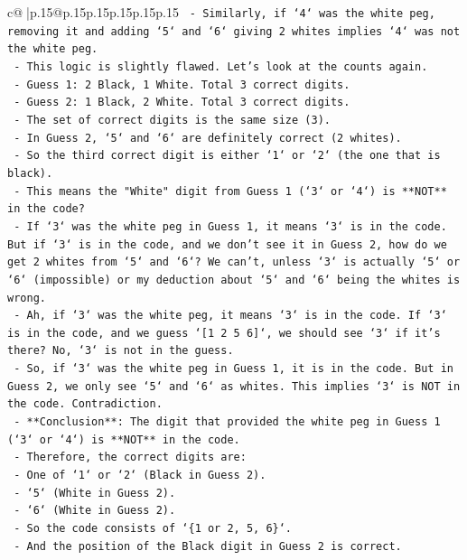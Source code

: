 \documentclass{article}
\begin{document}
{\begin{supertabular}{c@{$\;$}|p{.15\linewidth}@{}p{.15\linewidth}p{.15\linewidth}p{.15\linewidth}p{.15\linewidth}p{.15\linewidth}}
{{{\texttt{        {-} Similarly, if `4` was the white peg, removing it and adding `5` and `6` giving 2 whites implies `4` was not the white peg.} \\
\texttt{        {-} This logic is slightly flawed. Let's look at the counts again.} \\
\texttt{        {-} Guess 1: 2 Black, 1 White. Total 3 correct digits.} \\
\texttt{        {-} Guess 2: 1 Black, 2 White. Total 3 correct digits.} \\
\texttt{        {-} The set of correct digits is the same size (3).} \\
\texttt{        {-} In Guess 2, `5` and `6` are definitely correct (2 whites).} \\
\texttt{        {-} So the third correct digit is either `1` or `2` (the one that is black).} \\
\texttt{        {-} This means the "White" digit from Guess 1 (`3` or `4`) is **NOT** in the code?} \\
\texttt{        {-} If `3` was the white peg in Guess 1, it means `3` is in the code. But if `3` is in the code, and we don't see it in Guess 2, how do we get 2 whites from `5` and `6`? We can't, unless `3` is actually `5` or `6` (impossible) or my deduction about `5` and `6` being the whites is wrong.} \\
\texttt{        {-} Ah, if `3` was the white peg, it means `3` is in the code. If `3` is in the code, and we guess `{[}1 2 5 6{]}`, we should see `3` if it's there? No, `3` is not in the guess.} \\
\texttt{        {-} So, if `3` was the white peg in Guess 1, it is in the code. But in Guess 2, we only see `5` and `6` as whites. This implies `3` is NOT in the code. Contradiction.} \\
\texttt{        {-} **Conclusion**: The digit that provided the white peg in Guess 1 (`3` or `4`) is **NOT** in the code.} \\
\texttt{        {-} Therefore, the correct digits are:} \\
\texttt{            {-} One of `1` or `2` (Black in Guess 2).} \\
\texttt{            {-} `5` (White in Guess 2).} \\
\texttt{            {-} `6` (White in Guess 2).} \\
\texttt{        {-} So the code consists of `\{1 or 2, 5, 6\}`.} \\
\texttt{        {-} And the position of the Black digit in Guess 2 is correct.} \\
}}}
\end{supertabular}}
\end{document}
